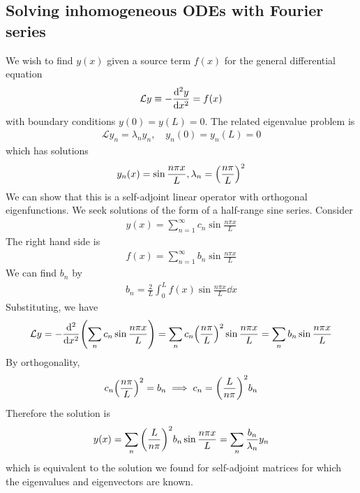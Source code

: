     \subsection{Solving inhomogeneous ODEs with Fourier series}
    We wish to find $y(x)$ given a source term $f(x)$ for the general differential equation
    \begin{align*}
        \mathcal L y \equiv -\dv[2]{y}{x} = f(x)
    \end{align*}
    with boundary conditions $y(0) = y(L) = 0$.
    The related eigenvalue problem is
    \begin{align*}
        \mathcal L y_n = \lambda_n y_n,\quad y_n(0) = y_n(L) = 0
    \end{align*}
    which has solutions
    \begin{align*}
        y_n(x) = \sin \frac{n \pi x}{L}, \lambda_n = \qty(\frac{n\pi}{L})^2
    \end{align*}
    We can show that this is a self-adjoint linear operator with orthogonal eigenfunctions.
    We seek solutions of the form of a half-range sine series.
    Consider
    \begin{align*}
        y(x) = \sum_{n=1}^\infty c_n \sin\frac{n \pi x}{L}
    \end{align*}
    The right hand side is
    \begin{align*}
        f(x) = \sum_{n=1}^\infty b_n \sin \frac{n \pi x}{L}
    \end{align*}
    We can find $b_n$ by
    \begin{align*}
        b_n = \frac{2}{L} \int_0^L f(x) \sin \frac{n \pi x}{L} \dd{x}
    \end{align*}
    Substituting, we have
    \begin{align*}
        \mathcal L y = -\dv[2]{x} \qty(\sum_n c_n \sin \frac{n \pi x}{L}) = \sum_n c_n \qty(\frac{n\pi}{L})^2 \sin \frac{n \pi x}{L} = \sum_n b_n \sin \frac{n \pi x}{L}
    \end{align*}
    By orthogonality,
    \begin{align*}
        c_n \qty(\frac{n \pi}{L})^2 = b_n \implies c_n = \qty(\frac{L}{n \pi})^2 b_n
    \end{align*}
    Therefore the solution is
    \begin{align*}
        y(x) = \sum_n \qty(\frac{L}{n \pi})^2 b_n \sin \frac{n \pi x}{L} = \sum_n \frac{b_n}{\lambda_n} y_n
    \end{align*}
    which is equivalent to the solution we found for self-adjoint matrices for which the eigenvalues and eigenvectors are known.
